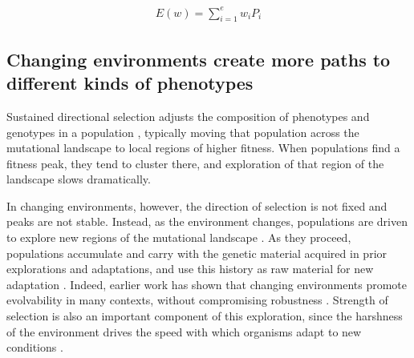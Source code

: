 \documentclass[10pt,letterpaper]{article}
\begin{document}
	\begin{eqnarray}
	\label{eq:expected_fitness_value}
		E(w) = \displaystyle\sum_{i=1}^{e} w_i P_i
	\end{eqnarray}

\subsection*{Changing environments create more paths to different kinds of phenotypes}
Sustained directional selection adjusts the composition of phenotypes and genotypes in a population \cite{wright_evolution_1931}, typically moving that population across the mutational landscape to local regions of higher fitness. When populations find a fitness peak, they tend to cluster there, and exploration of that region of the landscape slows dramatically.

In changing environments, however, the direction of selection is not fixed and peaks are not stable.  Instead, as the environment changes, populations are driven to explore new regions of the mutational landscape \cite{kashtan_varying_2007,connelly_negative_2015}. As they proceed, populations accumulate and carry with the genetic material acquired in prior explorations and adaptations, and use this history as raw material for new adaptation \cite{mcclintock_significance_1993}. Indeed, earlier work has shown that changing environments promote evolvability in many contexts, without compromising robustness \cite{crombach_evolution_2008,wilke_evolution_2001}. Strength of selection is also an important component of this exploration, since the harshness of the environment drives the speed with which organisms adapt to new conditions \cite{goddard_sex_2005}.
\end{document}
